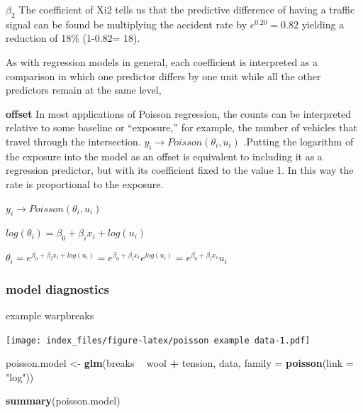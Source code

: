 \documentclass[
]{article}
\newenvironment{Shaded}{\begin{snugshade}}{\end{snugshade}}
\newcommand{\DataTypeTok}[1]{\textcolor[rgb]{0.13,0.29,0.53}{#1}}
\newcommand{\KeywordTok}[1]{\textcolor[rgb]{0.13,0.29,0.53}{\textbf{#1}}}
\newcommand{\NormalTok}[1]{#1}
\newcommand{\OperatorTok}[1]{\textcolor[rgb]{0.81,0.36,0.00}{\textbf{#1}}}
\newcommand{\StringTok}[1]{\textcolor[rgb]{0.31,0.60,0.02}{#1}}
\begin{document}
\(\beta_2\) The coefficient of Xi2 tells us that the predictive
difference of having a traffic signal can be found be multiplying the
accident rate by \(e^{0.20} = 0.82\) yielding a reduction of 18\%
(1-0.82= 18).

As with regression models in general, each coefficient is interpreted as
a comparison in which one predictor differs by one unit while all the
other predictors remain at the same level,

\textbf{offset} In most applications of Poisson regression, the counts
can be interpreted relative to some baseline or ``exposure,'' for
example, the number of vehicles that travel through the intersection.
\(y_i \to Poisson(\theta_i, u_i)\) .Putting the logarithm of the
exposure into the model as an offset is equivalent to including it as a
regression predictor, but with its coefficient fixed to the value 1. In
this way the rate is proportional to the exposure.

\(y_i \to Poisson(\theta_i, u_i)\)

\(log(\theta_i)= \beta_0 +\beta_ix_i + log(u_i)\)

\(\theta_i=e^{\beta_0 +\beta_ix_i + log(u_i)} = e^{\beta_0 +\beta_ix_i}e^{log(u_i)}= e^{\beta_0 +\beta_ix_i}u_i\)

\hypertarget{model-diagnostics-1}{%
\subsubsection{model diagnostics}\label{model-diagnostics-1}}

example warpbreaks

\begin{Shaded}
\end{Shaded}

\texttt{[image: index\_files/figure-latex/poisson example data-1.pdf]}

\begin{Shaded}
\begin{Highlighting}[]
\NormalTok{poisson.model <-}\StringTok{ }\KeywordTok{glm}\NormalTok{(breaks }\OperatorTok{~}\StringTok{ }\NormalTok{wool }\OperatorTok{+}\StringTok{ }\NormalTok{tension, data, }\DataTypeTok{family =} \KeywordTok{poisson}\NormalTok{(}\DataTypeTok{link =} \StringTok{"log"}\NormalTok{))}

\KeywordTok{summary}\NormalTok{(poisson.model)}
\end{Highlighting}
\end{Shaded}
\end{document}
